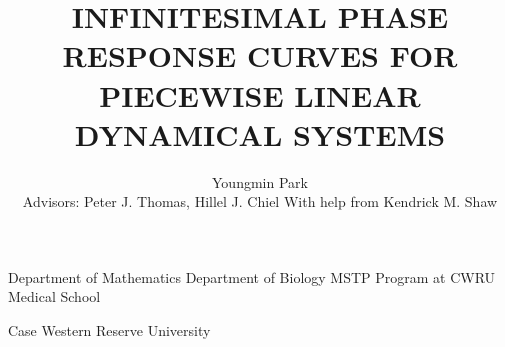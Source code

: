 \documentclass{beamer}
\begin{document}
\title{INFINITESIMAL PHASE RESPONSE CURVES FOR PIECEWISE LINEAR DYNAMICAL SYSTEMS}
\author %
{Youngmin Park\\
Advisors: Peter J. Thomas, Hillel J. Chiel
With help from Kendrick M. Shaw}
\institute %
{
  Department of Mathematics
  Department of Biology
  MSTP Program at CWRU Medical School
  
  Case Western Reserve University
}
\frame{\titlepage}


% 




\end{document}

